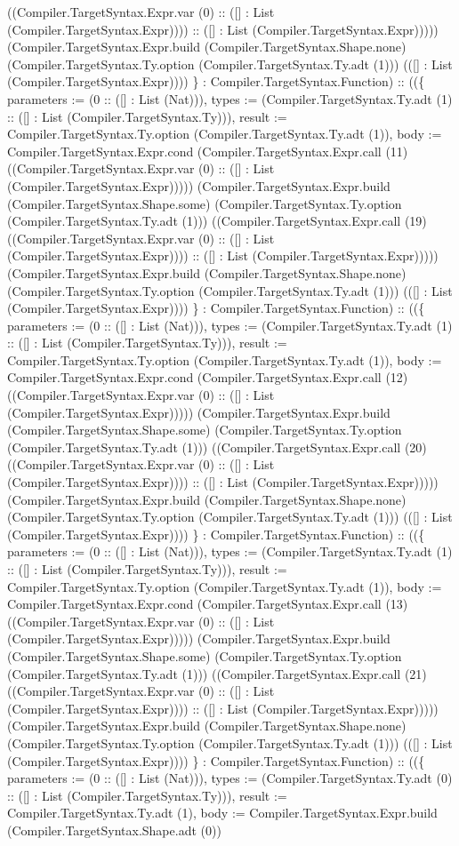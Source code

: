 \documentclass[11pt]{article}
\begin{document}
((Compiler.TargetSyntax.Expr.var (0) :: ([] : List (Compiler.TargetSyntax.Expr)))) :: ([] : List (Compiler.TargetSyntax.Expr))))) (Compiler.TargetSyntax.Expr.build (Compiler.TargetSyntax.Shape.none) (Compiler.TargetSyntax.Ty.option (Compiler.TargetSyntax.Ty.adt (1))) (([] : List (Compiler.TargetSyntax.Expr)))) \} : Compiler.TargetSyntax.Function) :: ((\{ parameters := (0 :: ([] : List (Nat))), types := (Compiler.TargetSyntax.Ty.adt (1) :: ([] : List (Compiler.TargetSyntax.Ty))), result := Compiler.TargetSyntax.Ty.option (Compiler.TargetSyntax.Ty.adt (1)), body := Compiler.TargetSyntax.Expr.cond (Compiler.TargetSyntax.Expr.call (11) ((Compiler.TargetSyntax.Expr.var (0) :: ([] : List (Compiler.TargetSyntax.Expr))))) (Compiler.TargetSyntax.Expr.build (Compiler.TargetSyntax.Shape.some) (Compiler.TargetSyntax.Ty.option (Compiler.TargetSyntax.Ty.adt (1))) ((Compiler.TargetSyntax.Expr.call (19) ((Compiler.TargetSyntax.Expr.var (0) :: ([] : List (Compiler.TargetSyntax.Expr)))) :: ([] : List (Compiler.TargetSyntax.Expr))))) (Compiler.TargetSyntax.Expr.build (Compiler.TargetSyntax.Shape.none) (Compiler.TargetSyntax.Ty.option (Compiler.TargetSyntax.Ty.adt (1))) (([] : List (Compiler.TargetSyntax.Expr)))) \} : Compiler.TargetSyntax.Function) :: ((\{ parameters := (0 :: ([] : List (Nat))), types := (Compiler.TargetSyntax.Ty.adt (1) :: ([] : List (Compiler.TargetSyntax.Ty))), result := Compiler.TargetSyntax.Ty.option (Compiler.TargetSyntax.Ty.adt (1)), body := Compiler.TargetSyntax.Expr.cond (Compiler.TargetSyntax.Expr.call (12) ((Compiler.TargetSyntax.Expr.var (0) :: ([] : List (Compiler.TargetSyntax.Expr))))) (Compiler.TargetSyntax.Expr.build (Compiler.TargetSyntax.Shape.some) (Compiler.TargetSyntax.Ty.option (Compiler.TargetSyntax.Ty.adt (1))) ((Compiler.TargetSyntax.Expr.call (20) ((Compiler.TargetSyntax.Expr.var (0) :: ([] : List (Compiler.TargetSyntax.Expr)))) :: ([] : List (Compiler.TargetSyntax.Expr))))) (Compiler.TargetSyntax.Expr.build (Compiler.TargetSyntax.Shape.none) (Compiler.TargetSyntax.Ty.option (Compiler.TargetSyntax.Ty.adt (1))) (([] : List (Compiler.TargetSyntax.Expr)))) \} : Compiler.TargetSyntax.Function) :: ((\{ parameters := (0 :: ([] : List (Nat))), types := (Compiler.TargetSyntax.Ty.adt (1) :: ([] : List (Compiler.TargetSyntax.Ty))), result := Compiler.TargetSyntax.Ty.option (Compiler.TargetSyntax.Ty.adt (1)), body := Compiler.TargetSyntax.Expr.cond (Compiler.TargetSyntax.Expr.call (13) ((Compiler.TargetSyntax.Expr.var (0) :: ([] : List (Compiler.TargetSyntax.Expr))))) (Compiler.TargetSyntax.Expr.build (Compiler.TargetSyntax.Shape.some) (Compiler.TargetSyntax.Ty.option (Compiler.TargetSyntax.Ty.adt (1))) ((Compiler.TargetSyntax.Expr.call (21) ((Compiler.TargetSyntax.Expr.var (0) :: ([] : List (Compiler.TargetSyntax.Expr)))) :: ([] : List (Compiler.TargetSyntax.Expr))))) (Compiler.TargetSyntax.Expr.build (Compiler.TargetSyntax.Shape.none) (Compiler.TargetSyntax.Ty.option (Compiler.TargetSyntax.Ty.adt (1))) (([] : List (Compiler.TargetSyntax.Expr)))) \} : Compiler.TargetSyntax.Function) :: ((\{ parameters := (0 :: ([] : List (Nat))), types := (Compiler.TargetSyntax.Ty.adt (0) :: ([] : List (Compiler.TargetSyntax.Ty))), result := Compiler.TargetSyntax.Ty.adt (1), body := Compiler.TargetSyntax.Expr.build (Compiler.TargetSyntax.Shape.adt (0)) 
\end{document}
